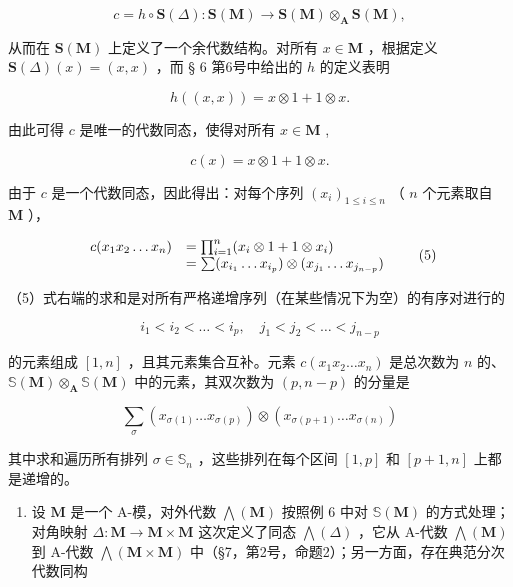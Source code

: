 \[
c = h \circ \mathbf {S} (\Delta): \mathbf {S} (\mathbf {M}) \rightarrow \mathbf {S} (\mathbf {M}) \otimes_ {\mathbf {A}} \mathbf {S} (\mathbf {M}),
\]

从而在 \(\mathbf{S}(\mathbf{M})\) 上定义了一个余代数结构。对所有 \(x\in \mathbf{M}\) ，根据定义 \(\mathbf{S}(\Delta)(x) = (x,x)\) ，而 § 6 第6号中给出的 \(h\) 的定义表明

\[
h ((x, x)) = x \otimes 1 + 1 \otimes x.
\]

由此可得 \(c\) 是唯一的代数同态，使得对所有 \(x \in \mathbf{M}\) ,

\[
c (x) = x \otimes 1 + 1 \otimes x.\tag{4}
\]

由于 \(c\) 是一个代数同态，因此得出：对每个序列 \((x_{i})_{1\leqslant i\leqslant n}\) （ \(n\) 个元素取自 \(\mathbf{M}\) ），

\[
\begin{array}{r l} c (x _ {1} x _ {2} \dots x _ {n}) & = \prod_ {i = 1} ^ {n} (x _ {i} \otimes 1 + 1 \otimes x _ {i}) \\ & = \sum (x _ {i _ {1}} \dots x _ {i _ {p}}) \otimes (x _ {j _ {1}} \dots x _ {j _ {n - p}}) \end{array}\tag{5}
\]

（5）式右端的求和是对所有严格递增序列（在某些情况下为空）的有序对进行的

\[
i _ {1} <   i _ {2} <   \dots <   i _ {p}, \quad j _ {1} <   j _ {2} <   \dots <   j _ {n - p}
\]

的元素组成 \([1, n]\) ，且其元素集合互补。元素 \(c(x_1 x_2 \ldots x_n)\) 是总次数为 \(n\) 的、 \(\mathbb{S}(\mathbf{M}) \otimes_{\mathbf{A}} \mathbb{S}(\mathbf{M})\) 中的元素，其双次数为 \((p, n - p)\) 的分量是

\[
\sum_ {\sigma} \left(x _ {\sigma (1)} \dots x _ {\sigma (p)}\right) \otimes \left(x _ {\sigma (p + 1)} \dots x _ {\sigma (n)}\right)\tag{6}
\]

其中求和遍历所有排列 \(\sigma\in\mathbb{S}_{n}\) ，这些排列在每个区间 \([1,p]\) 和 \([p+1,n]\) 上都是递增的。

\begin{enumerate}
\def\labelenumi{(\arabic{enumi})}
\setcounter{enumi}{6}
\tightlist
\item
  设 \(\mathbf{M}\) 是一个 A-模，对外代数 \(\bigwedge (\mathbf{M})\) 按照例 6 中对 \(\mathbb{S}(\mathbf{M})\) 的方式处理；对角映射 \(\Delta : \mathbf{M} \to \mathbf{M} \times \mathbf{M}\) 这次定义了同态 \(\bigwedge (\Delta)\) ，它从 A-代数 \(\bigwedge (\mathbf{M})\) 到 A-代数 \(\bigwedge (\mathbf{M} \times \mathbf{M})\) 中（§7，第2号，命题2）；另一方面，存在典范分次代数同构
\end{enumerate}

